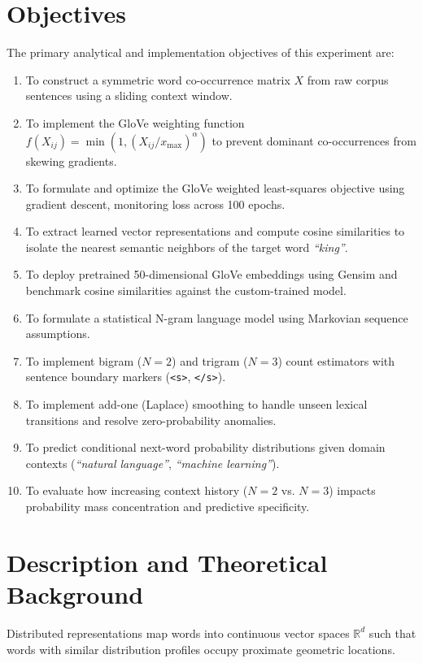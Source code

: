 \section{Objectives}
The primary analytical and implementation objectives of this experiment are:
\begin{enumerate}[label=\textbf{\arabic*.}]
    \item To construct a symmetric word co-occurrence matrix $X$ from raw corpus sentences using a sliding context window.
    \item To implement the GloVe weighting function $f(X_{ij}) = \min(1, (X_{ij}/x_{\max})^\alpha)$ to prevent dominant co-occurrences from skewing gradients.
    \item To formulate and optimize the GloVe weighted least-squares objective using gradient descent, monitoring loss across 100 epochs.
    \item To extract learned vector representations and compute cosine similarities to isolate the nearest semantic neighbors of the target word \textit{``king''}.
    \item To deploy pretrained 50-dimensional GloVe embeddings using Gensim and benchmark cosine similarities against the custom-trained model.
    \item To formulate a statistical N-gram language model using Markovian sequence assumptions.
    \item To implement bigram ($N=2$) and trigram ($N=3$) count estimators with sentence boundary markers (\texttt{<s>}, \texttt{</s>}).
    \item To implement add-one (Laplace) smoothing to handle unseen lexical transitions and resolve zero-probability anomalies.
    \item To predict conditional next-word probability distributions given domain contexts (\textit{``natural language''}, \textit{``machine learning''}).
    \item To evaluate how increasing context history ($N=2$ vs. $N=3$) impacts probability mass concentration and predictive specificity.
\end{enumerate}

\section{Description and Theoretical Background}
Distributed representations map words into continuous vector spaces $\mathbb{R}^d$ such that words with similar distribution profiles occupy proximate geometric locations.

